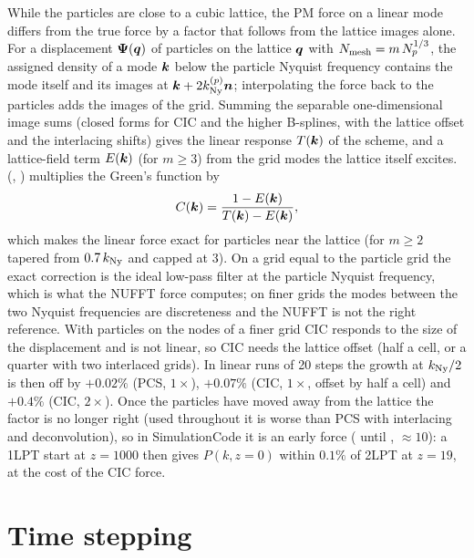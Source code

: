 While the particles are close to a cubic lattice, the PM force on a linear mode differs from the true force by a factor
that follows from the lattice images alone. For a displacement $\bm\Psi(\bm{q})$ of particles on the lattice $\bm{q}$ with
$N_{\rm mesh}=m\,N_p^{1/3}$, the assigned density of a mode $\bm{k}$ below the particle Nyquist frequency contains the mode
itself and its images at $\bm{k}+2k_{\rm Ny}^{(p)}\bm n$; interpolating the force back to the particles adds the images of
the grid. Summing the separable one-dimensional image sums (closed forms for CIC and the higher B-splines, with the
lattice offset and the interlacing shifts) gives the linear response $T(\bm{k})$ of the scheme, and a lattice-field term
$E(\bm{k})$ (for $m\ge3$) from the grid modes the lattice itself excites. 
(, ) multiplies the Green's function by
\begin{equation}
C(\bm{k})=\frac{1-E(\bm{k})}{T(\bm{k})-E(\bm{k})},
\end{equation}
which makes the linear force exact for particles near the lattice (for $m\ge2$ tapered from $0.7\,k_{\rm Ny}$ and capped
at 3). On a grid equal to the particle grid the exact correction is the ideal low-pass filter at the particle Nyquist
frequency, which is what the NUFFT force computes; on finer grids the modes between the two Nyquist frequencies are
discreteness and the NUFFT is not the right reference. With particles on the nodes of a finer grid CIC responds to the
size of the displacement and is not linear, so CIC needs the lattice offset (half a cell, or a quarter with two
interlaced grids). In linear runs of 20 steps the growth at $k_{\rm Ny}/2$ is then off by $+0.02\%$ (PCS, $1\times$),
$+0.07\%$ (CIC, $1\times$, offset by half a cell) and $+0.4\%$ (CIC, $2\times$). Once the particles have moved away
from the lattice the factor is no longer right (used throughout it is worse than PCS with interlacing and
deconvolution), so in SimulationCode it is an early force ( until
, $\approx10$): a 1LPT start at $z=1000$ then gives $P(k,z=0)$ within
$0.1\%$ of 2LPT at $z=19$, at the cost of the CIC force.

\section{Time stepping}\label{sec:nbody-timestepping}

